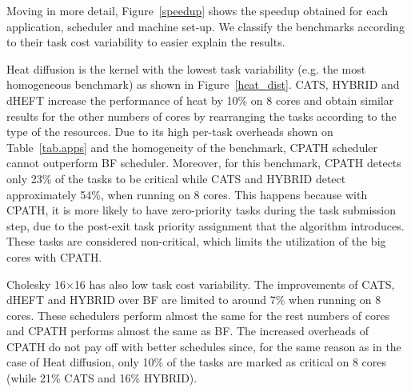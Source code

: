 Moving in more detail, Figure~\ref{speedup} shows the speedup obtained for each application,  scheduler and machine set-up.
We classify the benchmarks according to their task cost variability to easier explain the results.



Heat diffusion is the kernel with the lowest task variability (e.g. the most homogeneous benchmark) as shown in Figure~\ref{heat_dist}.
CATS, HYBRID and dHEFT increase the performance of heat by 10\% on 8 cores and obtain similar results for the other numbers of cores by rearranging the tasks according to the type of the resources.
Due to its high per-task overheads shown on Table~\ref{tab.apps}
 and the homogeneity of the benchmark, CPATH scheduler cannot outperform BF scheduler. 
Moreover, for this benchmark, CPATH detects only 23\% of the tasks to be critical while CATS and HYBRID detect approximately 54\%, when running on 8 cores.
This happens because with CPATH, it is more likely to have zero-priority tasks during the task submission step, due to the post-exit task priority assignment that the algorithm introduces. 
These tasks are considered non-critical, which limits the utilization of the big cores with CPATH. 


Cholesky 16$\times$16 has also low task cost variability. 
The improvements of CATS, dHEFT and HYBRID over BF are limited to around 7\% when running on 8 cores.
These schedulers perform almost the same for the rest numbers of cores and CPATH performs almost the same as BF. 
The increased overheads of CPATH do not pay off with better schedules since, for the same reason as in the case of Heat diffusion, only 10\% of the tasks are marked as critical on 8 cores (while 21\% CATS and 16\% HYBRID).


